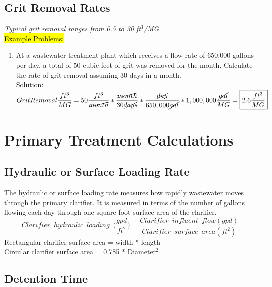 \subsection{Grit Removal Rates}
\emph{Typical grit removal ranges from 0.5 to 30 ft$^3$/MG}\\
\vspace{0.3cm}
\hl{Example Problems:}\\
\begin{enumerate}[1.]
\item At a wastewater treatment plant which receives a flow rate of 650,000 gallons per day, a total of 50 cubic feet of grit was removed for the month. Calculate the rate of grit removal assuming 30 days in a month.\\
Solution:\\
$Grit Removal\dfrac{ft^3}{MG}=50\dfrac{ft^3}{ \cancel{month}}*\dfrac{\cancel{month}}{30\cancel{days}}*\dfrac{\cancel{day}}{650,000\cancel{gal}}*1,000,000\dfrac{\cancel{gal}}{MG}=\boxed{2.6\dfrac{ft^3}{MG}}$
\end{enumerate}

\section{Primary Treatment Calculations}

\subsection{Hydraulic or Surface Loading Rate}

The hydraulic or surface loading rate measures how rapidly wastewater moves through the primary clarifier.  It is measured in terms of the number of gallons flowing each day through one square foot surface area of the clarifier. 
$$Clarifier \enspace hydraulic \enspace loading \enspace 	\Big(\dfrac{gpd}{ft^2}\Big) =\dfrac{Clarifier \enspace influent 	\enspace flow (gpd)}{Clarifier \enspace surface \enspace area 	(ft^2)}$$ 
		Rectangular clarifier surface area  = width * length\\
		Circular clarifier surface area  = 0.785 * Diameter$^2 $\\
\subsection{Detention Time}

